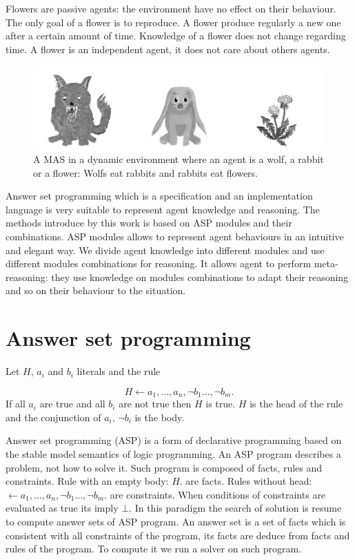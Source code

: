 \documentclass{aamas2012}
\begin{document}
	Flowers are passive agents: the environment have no effect on their behaviour.
	The only goal of a flower is to reproduce.
	A flower produce regularly a new one after a certain amount of time.
	Knowledge of a flower does not change regarding time.
	A flower is an independent agent, it does not care about others agents.

	\begin{figure}
		\centering
		\includegraphics[keepaspectratio=true,scale=3.0]{food_chain.png}
		\caption
		{
			\label{food_chain}
			A MAS in a dynamic environment where an agent is a wolf, a rabbit or a flower:
			Wolfs eat rabbits and rabbits eat flowers.
		}
	\end{figure}
	
	Answer set programming which is a specification and an implementation language is very suitable to represent agent knowledge and reasoning.
	The methods introduce by this work is based on ASP modules and their combinations.
	ASP modules allows to represent agent behaviours in an intuitive and elegant way.
	We divide agent knowledge into different modules and use different modules combinations for reasoning.
	It allows agent to perform meta-reasoning: they use knowledge on modules combinations to adapt their reasoning and so on their behaviour to the situation.

\section{Answer set programming}

	\begin{definition}[Rule]
		Let $H$, $a_{i}$ and $b_{i}$ literals and the rule
	
					$$H \leftarrow a_{1}, \ldots , a_{n}, \neg b_{1} \ldots, \neg b_{m}.$$
		If all $a_{i}$ are true and all $b_{i}$ are not true then $H$ is true.
		$H$ is the head of the rule and the conjunction of $a_{i}$, $\neg b_{i}$ is the body.
	\end{definition}

	Answer set programming (ASP) is a form of declarative programming based on the stable model semantics of logic programming.
	An ASP program describes a problem, not how to solve it.
	Such program is composed of facts, rules and constraints. 
	Rule with an empty body: $H.$ are facts.
	Rules without head: $\leftarrow a_{1}, \ldots , a_{n}, \neg b_{1} \ldots, \neg b_{m}.$ are constraints.
	When conditions of constraints are evaluated as true its imply $\bot$.
	In this paradigm the search of solution is resume to compute answer sets of ASP program.
	An answer set is a set of facts which is consistent with all constraints of the program, its facts are deduce from facts and rules of the program.
	To compute it we run a solver on such program.
	
\end{document}

